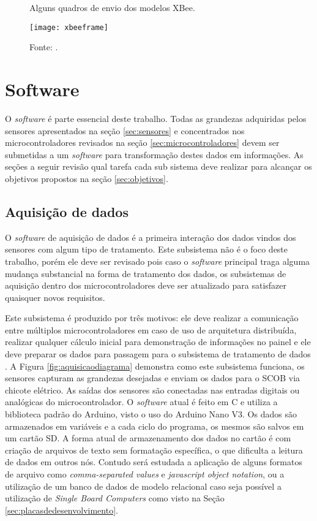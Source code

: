 \begin{figure}[!htb]
	\centering
		\caption{Alguns quadros de envio dos modelos XBee.}
		\texttt{[image: xbeeframe]} 
		\caption*{Fonte: \cite{xbeetutorial}.}
		\label{fig:xbeeframe}
\end{figure} 


\section{Software}
\label{sec:software}

O \textit{software} é parte essencial deste trabalho. Todas as grandezas adquiridas pelos sensores apresentados na seção \ref{sec:sensores} e concentrados nos microcontroladores revisados na seção \ref{sec:microcontroladores} devem ser submetidas a um \textit{software} para transformação destes dados em informações. As seções a seguir revisão qual tarefa cada sub sistema deve realizar para alcançar os objetivos propostos na seção \ref{sec:objetivos}.  

\subsection{Aquisição de dados}
\label{sec:aquisicaodedados}

O \textit{software} de aquisição de dados é a primeira interação dos dados vindos dos sensores com algum tipo de tratamento. Este subsistema não é o foco deste trabalho, porém ele deve ser revisado pois caso o \textit{software} principal traga alguma mudança substancial na forma de tratamento dos dados, os subsistemas de aquisição dentro dos microcontroladores deve ser atualizado para satisfazer quaisquer novos requisitos.

Este subsistema é produzido por três motivos: ele deve realizar a comunicação entre múltiplos microcontroladores em caso de uso de arquitetura distribuída, realizar qualquer cálculo inicial para demonstração de informações no painel e ele deve preparar os dados para passagem para o subsistema de tratamento de dados \cite{racecarInstrumentationFor2012}\cite{projetoMiniBaja2006}\cite{designAndImplementation2015}\cite{Dias2010}\cite{Nunes2016}. A Figura \ref{fig:aquisicaodiagrama} demonstra como este subsistema funciona, os sensores capturam as grandezas desejadas e enviam os dados para o SCOB via chicote elétrico. As saídas dos sensores são conectadas nas entradas digitais ou analógicas do microcontrolador. O \textit{software} atual é feito em C e utiliza a biblioteca padrão do Arduino, visto o uso do Arduino Nano V3. Os dados são armazenados em variáveis e a cada ciclo do programa, os mesmos são salvos em um cartão SD. A forma atual de armazenamento dos dados no cartão é com criação de arquivos de texto sem formatação específica, o que dificulta a leitura de dados em outros nós. Contudo será estudada a aplicação de alguns formatos de arquivo como \textit{comma-separated values} e \textit{javascript object notation}, ou a utilização de um banco de dados de modelo relacional caso seja possível a utilização de \textit{Single Board Computers} como visto na Seção \ref{sec:placasdedesenvolvimento}.      

